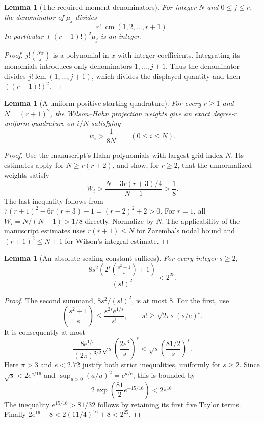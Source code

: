 \documentclass[11pt]{article}
\newtheorem{lemma}[theorem]{Lemma}
\begin{document}
\begin{lemma}[The required moment denominators]
For integer $N$ and $0\le j\le r$, the denominator of $\mu_j$ divides
\[
 r!\operatorname{lcm}(1,2,\ldots,r+1).
\]
In particular $((r+1)!)^2\mu_j$ is an integer.
\end{lemma}
\begin{proof}
$j!\binom{Nx}{j}$ is a polynomial in $x$ with integer coefficients.
Integrating its monomials introduces only denominators $1,\ldots,j+1$.
Thus the denominator divides $j!\operatorname{lcm}(1,\ldots,j+1)$,
which divides the displayed quantity and then $((r+1)!)^2$.
\end{proof}

\begin{lemma}[A uniform positive starting quadrature]\label{lem:positive}
For every $r\ge1$ and $N=(r+1)^2$, the Wilson--Hahn projection weights
give an exact degree-$r$ uniform quadrature on $i/N$ satisfying
\[
 w_i>\frac1{8N}\qquad(0\le i\le N).
\]
\end{lemma}
\begin{proof}
Use the manuscript's Hahn polynomials with largest grid index $N$.
Its estimates apply for $N\ge r(r+2)$, and show, for $r\ge2$, that the
unnormalized weights satisfy
\[
 W_i>\frac{N-3r(r+3)/4}{N+1}>\frac18.
\]
The last inequality follows from
$7(r+1)^2-6r(r+3)-1=(r-2)^2+2>0$.
For $r=1$, all $W_i=N/(N+1)>1/8$ directly. Normalize by $N$.
The applicability of the manuscript estimates uses
$r(r+1)\le N$ for Zaremba's nodal bound and
$(r+1)^2\le N+1$ for Wilson's integral estimate.
\end{proof}

\begin{lemma}[An absolute scaling constant suffices]\label{lem:constant}
For every integer $s\ge2$,
\[
 \frac{8s^2\left(2^s\binom{s^2+1}{s}+1\right)}{(s!)^2}<2^{25}.
\]
\end{lemma}
\begin{proof}
The second summand, $8s^2/(s!)^2$, is at most $8$.
For the first, use
\[
 \binom{s^2+1}{s}\le\frac{s^{2s}e^{1/s}}{s!},
 \qquad s!\ge\sqrt{2\pi s}(s/e)^s.
\]
It is consequently at most
\[
 \frac{8e^{1/s}}{(2\pi)^{3/2}}\sqrt{s}
       \left(\frac{2e^3}{s}\right)^s
 <\sqrt{s}\left(\frac{81/2}{s}\right)^s.
\]
Here $\pi>3$ and $e<2.72$ justify both strict inequalities, uniformly
for $s\ge2$. Since $\sqrt{s}<2e^{s/16}$ and
$\sup_{u>0}(a/u)^u=e^{a/e}$, this is bounded by
\[
 2\exp\left(\frac{81}{2}e^{-15/16}\right)<2e^{16}.
\]
The inequality $e^{15/16}>81/32$ follows by retaining its first five
Taylor terms. Finally
$2e^{16}+8<2(11/4)^{16}+8<2^{25}$.
\end{proof}
\end{document}
